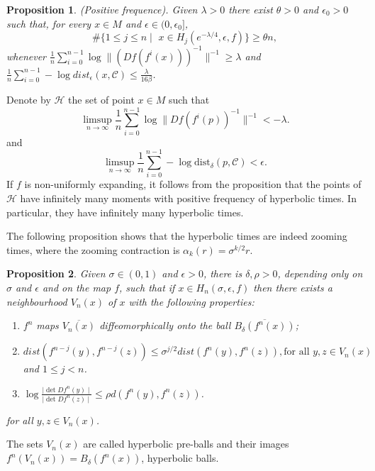 \documentclass[12pt,a4paper]{amsart}
\theoremstyle{plain}
\newtheorem{proposition}{Proposition}[subsection]
\begin{document}
\begin{proposition}
	(Positive frequence). Given $\lambda > 0$ there exist $\theta > 0$ and $\epsilon_{0} > 0$ such that, for every $x \in M$ and $\epsilon \in (0,\epsilon_{0}]$,
	\[
	\#\{1 \leq j \leq n \mid \,\, x \in H_{j}(e^{-\lambda \slash 4}, \epsilon, f) \} \geq \theta n,
	\]
	whenever $\frac{1}{n}\sum_{i=0}^{n-1}\log\|(Df(f^{i}(x)))^{-1}\|^{-1} \geq \lambda$ and $\frac{1}{n}\sum_{i=0}^{n-1}-\log dist_{\epsilon}(x, \mathcal{C}) \leq \frac{\lambda}{16 \beta}$.
\end{proposition}

Denote by $\mathcal{H}$ the set of point $x \in M$ such that
\[
\displaystyle \limsup_{n \to \infty} \frac{1}{n} \sum_{i=0}^{n-1} \log \parallel Df(f^{i}(p))^{-1}\parallel^{-1} < -\lambda.
\] 
and
\[
\displaystyle \limsup_{n \to \infty} \frac{1}{n} \sum_{i=0}^{n-1} - \log \text{dist}_{\delta}(p,\mathcal{C}) < \epsilon.
\]
If $f$ is non-uniformly expanding, it follows from the proposition that the points of $\mathcal{H}$ have infinitely many moments with positive frequency of hyperbolic times. In particular, they have infinitely many hyperbolic times.

The following proposition shows that the hyperbolic times are indeed zooming times, where the zooming contraction is $\alpha_{k}(r) = \sigma^{k/2}r$.

\begin{proposition}
	Given $\sigma \in (0,1)$ and $\epsilon > 0$, there is $\delta,\rho > 0$, depending only on $\sigma$ and $\epsilon$ and on the map $f$, such that if $x \in H_{n}(\sigma,\epsilon,f)$ then there exists a neighbourhood $V_{n}(x)$ of $x$ with the following properties:
	
	\begin{enumerate}
		\item[(1)] $f^{n}$ maps $\overline{V_{n}(x)}$ diffeomorphically onto the ball $\overline{B_{\delta}(f^{n}(x))}$;
		\item[(2)] $dist(f^{n-j}(y),f^{n-j}(z)) \leq \sigma^{j\slash 2} dist(f^{n}(y), f^{n}(z)), \text{for all} \, \, y,z \in V_ {n}(x)$ and $1 \leq j < n$.
		\item[(3)]$\log \frac{\mid \det Df^{n}(y)\mid}{\mid \det Df^{n}(z)\mid} \leq \rho d(f^{n}(y),f^{n}(z))$.
	\end{enumerate}
	
	for all $y,z \in V_{n}(x)$.
\end{proposition}

The sets $V_{n}(x)$ are called hyperbolic pre-balls and their images $f^{n}(V_{n}(x)) = B_{\delta}(f^{n}(x))$, hyperbolic balls.
\end{document}
